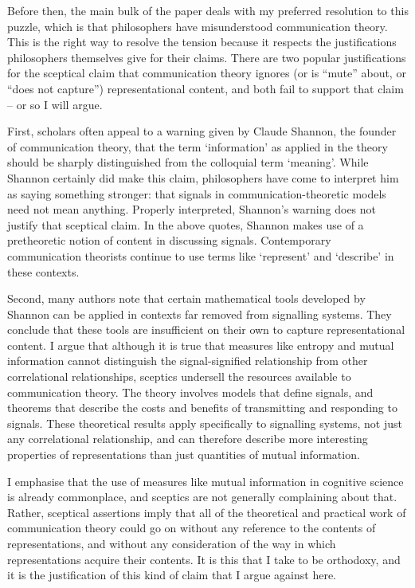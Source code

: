 \documentclass[12pt]{article}
\begin{document}
Before then, the main bulk of the paper deals with my preferred resolution to this puzzle, which is that philosophers have misunderstood communication theory.
This is the right way to resolve the tension because it respects the justifications philosophers themselves give for their claims.
There are two popular justifications for the sceptical claim that communication theory ignores (or is ``mute'' about, or ``does not capture'') representational content, and both fail to support that claim -- or so I will argue.

First, scholars often appeal to a warning given by Claude Shannon, the founder of communication theory, that the term `information' as applied in the theory should be sharply distinguished from the colloquial term `meaning'.
While Shannon certainly did make this claim, philosophers have come to interpret him as saying something stronger: that signals in communication-theoretic models need not mean anything.
Properly interpreted, Shannon's warning does not justify that sceptical claim.
In the above quotes, Shannon makes use of a pretheoretic notion of content in discussing signals.
Contemporary communication theorists continue to use terms like `represent' and `describe' in these contexts.

Second, many authors note that certain mathematical tools developed by Shannon can be applied in contexts far removed from signalling systems.
They conclude that these tools are insufficient on their own to capture representational content.
I argue that although it is true that measures like entropy and mutual information cannot distinguish the signal-signified relationship from other correlational relationships, sceptics undersell the resources available to communication theory.
The theory involves models that define signals, and theorems that describe the costs and benefits of transmitting and responding to signals.
These theoretical results apply specifically to signalling systems, not just any correlational relationship, and can therefore describe more interesting properties of representations than just quantities of mutual information.

I emphasise that the use of measures like mutual information in cognitive science is already commonplace, and sceptics are not generally complaining about that.
Rather, sceptical assertions imply that all of the theoretical and practical work of communication theory could go on without any reference to the contents of representations, and without any consideration of the way in which representations acquire their contents.
It is this that I take to be orthodoxy, and it is the justification of this kind of claim that I argue against here.
\end{document}
